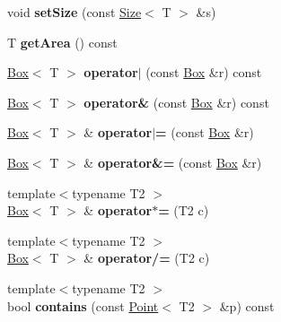 \begin{DoxyCompactItemize}
\item 
\hypertarget{class_box_acd6d5e40c68328ff7a000574a306483b}{
void {\bfseries setSize} (const \hyperlink{class_size}{Size}$<$ T $>$ \&s)}
\label{class_box_acd6d5e40c68328ff7a000574a306483b}

\item 
\hypertarget{class_box_aa929e8c0b27bef9952ee0609eacf9181}{
T {\bfseries getArea} () const }
\label{class_box_aa929e8c0b27bef9952ee0609eacf9181}

\item 
\hypertarget{class_box_ad98b489652ab9b1e98171bc07c3526b0}{
\hyperlink{class_box}{Box}$<$ T $>$ {\bfseries operator$|$} (const \hyperlink{class_box}{Box} \&r) const }
\label{class_box_ad98b489652ab9b1e98171bc07c3526b0}

\item 
\hypertarget{class_box_a4e303bf9c573dba8cfe7b6f699741040}{
\hyperlink{class_box}{Box}$<$ T $>$ {\bfseries operator\&} (const \hyperlink{class_box}{Box} \&r) const }
\label{class_box_a4e303bf9c573dba8cfe7b6f699741040}

\item 
\hypertarget{class_box_a579f1152f2212990aa033498e0623ea6}{
\hyperlink{class_box}{Box}$<$ T $>$ \& {\bfseries operator$|$=} (const \hyperlink{class_box}{Box} \&r)}
\label{class_box_a579f1152f2212990aa033498e0623ea6}

\item 
\hypertarget{class_box_ab5252631a5509f4af38de365458f6e55}{
\hyperlink{class_box}{Box}$<$ T $>$ \& {\bfseries operator\&=} (const \hyperlink{class_box}{Box} \&r)}
\label{class_box_ab5252631a5509f4af38de365458f6e55}

\item 
\hypertarget{class_box_aa0b872c351b0c2ba6fc6530ca280d578}{
{\footnotesize template$<$typename T2 $>$ }\\\hyperlink{class_box}{Box}$<$ T $>$ \& {\bfseries operator$\ast$=} (T2 c)}
\label{class_box_aa0b872c351b0c2ba6fc6530ca280d578}

\item 
\hypertarget{class_box_ac17ada56acb602f31fc5153a50c105ba}{
{\footnotesize template$<$typename T2 $>$ }\\\hyperlink{class_box}{Box}$<$ T $>$ \& {\bfseries operator/=} (T2 c)}
\label{class_box_ac17ada56acb602f31fc5153a50c105ba}

\item 
\hypertarget{class_box_a349c282feb79bd25acd2e019e324cb29}{
{\footnotesize template$<$typename T2 $>$ }\\bool {\bfseries contains} (const \hyperlink{class_point}{Point}$<$ T2 $>$ \&p) const }
\label{class_box_a349c282feb79bd25acd2e019e324cb29}


\end{DoxyCompactItemize}
